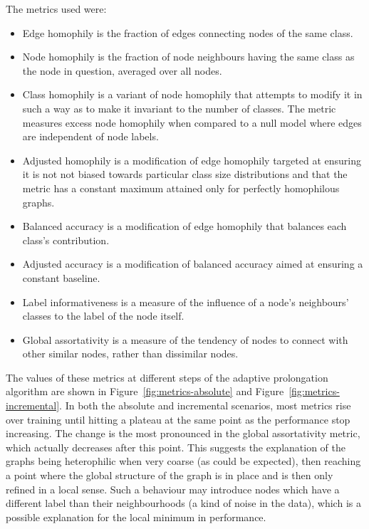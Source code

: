 The metrics used were:
\begin{itemize}
  \item Edge homophily \cite{zhu_beyond_2020} is the fraction of edges connecting nodes of the same class.
  \item Node homophily \cite{pei_geom-gcn_2020} is the fraction of node neighbours having the same class as the node in question, averaged over all nodes.
  \item Class homophily \cite{lim_large_2021} is a variant of node homophily that attempts to modify it in such a way as to make it invariant to the number of classes. The metric measures excess node homophily when compared to a null model where edges are independent of node labels.
  \item Adjusted homophily \cite{platonov_characterizing_2022} is a modification of edge homophily targeted at ensuring it is not not biased towards particular class size distributions and that the metric has a constant maximum attained only for perfectly homophilous graphs.
  \item Balanced accuracy \cite{platonov_characterizing_2022} is a modification of edge homophily that balances each class's contribution.
  \item Adjusted accuracy \cite{platonov_characterizing_2022} is a modification of balanced accuracy aimed at ensuring a constant baseline.
  \item Label informativeness \cite{platonov_characterizing_2022} is a measure of the influence of a node's neighbours' classes to the label of the node itself.
  \item Global assortativity \cite{newman_mixing_2003} is a measure of the tendency of nodes to connect with other similar nodes, rather than dissimilar nodes.
\end{itemize}

The values of these metrics at different steps of the adaptive prolongation algorithm are shown in Figure~\ref{fig:metrics-absolute} and Figure~\ref{fig:metrics-incremental}. In both the absolute and incremental scenarios, most metrics rise over training until hitting a plateau at the same point as the performance stop increasing. The change is the most pronounced in the global assortativity metric, which actually decreases after this point. This suggests the explanation of the graphs being heterophilic when very coarse (as could be expected), then reaching a point where the global structure of the graph is in place and is then only refined in a local sense. Such a behaviour may introduce nodes which have a different label than their neighbourhoods (a kind of noise in the data), which is a possible explanation for the local minimum in performance.

